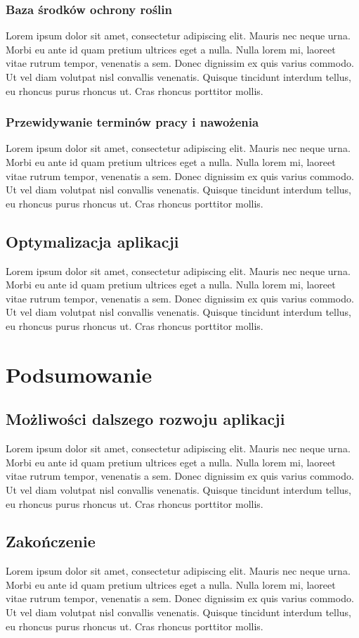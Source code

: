 \documentclass[a4paper,12pt,oneside]{book}
\begin{document}
	\subsection{Baza środków ochrony roślin}
		Lorem ipsum dolor sit amet, consectetur adipiscing elit. Mauris nec neque urna. Morbi eu ante id quam pretium ultrices eget a nulla. Nulla lorem mi, laoreet vitae rutrum tempor, venenatis a sem. Donec dignissim ex quis varius commodo. Ut vel diam volutpat nisl convallis venenatis. Quisque tincidunt interdum tellus, eu rhoncus purus rhoncus ut. Cras rhoncus porttitor mollis.
	
	\subsection{Przewidywanie terminów pracy i nawożenia}
		Lorem ipsum dolor sit amet, consectetur adipiscing elit. Mauris nec neque urna. Morbi eu ante id quam pretium ultrices eget a nulla. Nulla lorem mi, laoreet vitae rutrum tempor, venenatis a sem. Donec dignissim ex quis varius commodo. Ut vel diam volutpat nisl convallis venenatis. Quisque tincidunt interdum tellus, eu rhoncus purus rhoncus ut. Cras rhoncus porttitor mollis.
	
	\section{Optymalizacja aplikacji}
		Lorem ipsum dolor sit amet, consectetur adipiscing elit. Mauris nec neque urna. Morbi eu ante id quam pretium ultrices eget a nulla. Nulla lorem mi, laoreet vitae rutrum tempor, venenatis a sem. Donec dignissim ex quis varius commodo. Ut vel diam volutpat nisl convallis venenatis. Quisque tincidunt interdum tellus, eu rhoncus purus rhoncus ut. Cras rhoncus porttitor mollis.
	
	\newpage
	\chapter{Podsumowanie}
	\section{Możliwości dalszego rozwoju aplikacji}
	Lorem ipsum dolor sit amet, consectetur adipiscing elit. Mauris nec neque urna. Morbi eu ante id quam pretium ultrices eget a nulla. Nulla lorem mi, laoreet vitae rutrum tempor, venenatis a sem. Donec dignissim ex quis varius commodo. Ut vel diam volutpat nisl convallis venenatis. Quisque tincidunt interdum tellus, eu rhoncus purus rhoncus ut. Cras rhoncus porttitor mollis.
	\section{Zakończenie}
	Lorem ipsum dolor sit amet, consectetur adipiscing elit. Mauris nec neque urna. Morbi eu ante id quam pretium ultrices eget a nulla. Nulla lorem mi, laoreet vitae rutrum tempor, venenatis a sem. Donec dignissim ex quis varius commodo. Ut vel diam volutpat nisl convallis venenatis. Quisque tincidunt interdum tellus, eu rhoncus purus rhoncus ut. Cras rhoncus porttitor mollis.
	
\end{document}
